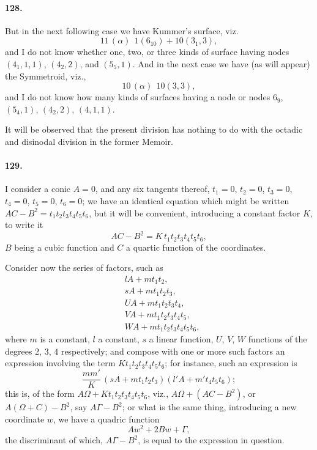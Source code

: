 \documentclass[11pt,a4paper]{article}
\begin{document}
\paragraph{128.}
But in the next following case we have Kummer's surface, viz.
\[
11\,(\alpha)\ \ 1(6_{10}) + 10(3_1, 3),
\]
and I do not know whether one, two, or three kinds of surface having
nodes $(4_1, 1, 1)$, $(4_2, 2)$, and $(5_5, 1)$. And in the next case we
have (as will appear) the Symmetroid, viz.,
\[
10\,(\alpha)\ \ 10(3, 3),
\]
and I do not know how many kinds of surfaces having a node or nodes $6_9$,
$(5_4, 1)$, $(4_2, 2)$, $(4, 1, 1)$.

It will be observed that the present division has nothing to do with the
octadic and disinodal division in the former Memoir.

\paragraph{129.}
I consider a conic $A = 0$, and any six tangents thereof, $t_1 = 0$,
$t_2 = 0$, $t_3 = 0$, $t_4 = 0$, $t_5 = 0$, $t_6 = 0$; we have an
identical equation which might be written
$AC - B^2 = t_1 t_2 t_3 t_4 t_5 t_6$, but it will be convenient,
introducing a constant factor $K$, to write it
\[
AC - B^2 = K\, t_1 t_2 t_3 t_4 t_5 t_6,
\]
$B$ being a cubic function and $C$ a quartic function of the coordinates.

Consider now the series of factors, such as
\[
\begin{aligned}
& lA + m t_1 t_2, \\
& sA + m t_1 t_2 t_3, \\
& UA + m t_1 t_2 t_3 t_4, \\
& VA + m t_1 t_2 t_3 t_4 t_5, \\
& WA + m t_1 t_2 t_3 t_4 t_5 t_6,
\end{aligned}
\]
where $m$ is a constant, $l$ a constant, $s$ a linear function, $U$, $V$,
$W$ functions of the degrees $2$, $3$, $4$ respectively; and compose with
one or more such factors an expression involving the term
$K t_1 t_2 t_3 t_4 t_5 t_6$; for instance, such an expression is
\[
\frac{m m'}{K}\, (sA + m t_1 t_2 t_3)(l'A + m' t_4 t_5 t_6);
\]
this is, of the form $A \Omega + K t_1 t_2 t_3 t_4 t_5 t_6$, viz.,
$A \Omega + (AC - B^2)$, or $A(\Omega + C) - B^2$, say $A\Gamma - B^2$;
or what is the same thing, introducing a new coordinate $w$, we have a
quadric function
\[
A w^2 + 2 B w + \Gamma,
\]
the discriminant of which, $A\Gamma - B^2$, is equal to the expression in
question.
\end{document}
